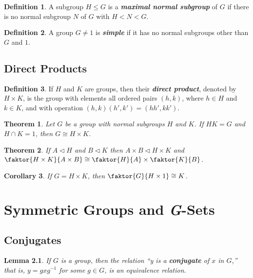 \documentclass[12pt]{report}
\newtheorem{theorem}{Theorem}[chapter]
\newtheorem{corollary}[theorem]{Corollary}
\newtheorem{lemma}[theorem]{Lemma}
\theoremstyle{definition}
\newtheorem*{definition}{Definition}
\newcommand{\term}[1]{\textbf{\textit{#1}}}
\begin{document}
\begin{definition}
	A subgroup $H\leq G$ is a \term{maximal normal subgroup} of $G$ if there is no normal subgroup $N$ of $G$ with $H<N<G$.	
\end{definition}

\begin{definition}
	A group $G\neq 1$ is \term{simple} if it has no normal subgroups other than $G$ and $1$.
\end{definition}



\section{Direct Products}

\begin{definition}
	If $H$ and $K$ are groups, then their \term{direct product}, denoted by $H\times K$, is the group with elements all
	ordered pairs $(h, k)$, where $h\in H$ and $k\in K$, and with operation $(h, k)(h', k')=(hh', kk')$.
\end{definition}

\begin{theorem}
	Let $G$ be a group with normal subgroups $H$ and $K$. If $HK=G$ and $H\cap K=1$, then $G\cong H\times K$.
\end{theorem}

\begin{theorem}
	If $A\vartriangleleft H$ and $B\vartriangleleft K$ then $A\times B\vartriangleleft H\times K$ and
	$\faktor{H\times K}{A\times B}\cong\faktor{H}{A}\times\faktor{K}{B}$.
\end{theorem}

\begin{corollary}
	If $G=H\times K$, then $\faktor{G}{H\times 1}\cong K$.
\end{corollary}


\chapter{Symmetric Groups and \textit{G}-Sets}

\section{Conjugates}
\begin{lemma}
	If $G$ is a group, then the relation “y is a \term{conjugate} of $x$ in $G$,” that is, $y=gxg^{-1}$ for some $g\in G$, is an equivalence relation.
\end{lemma}
\end{document}
